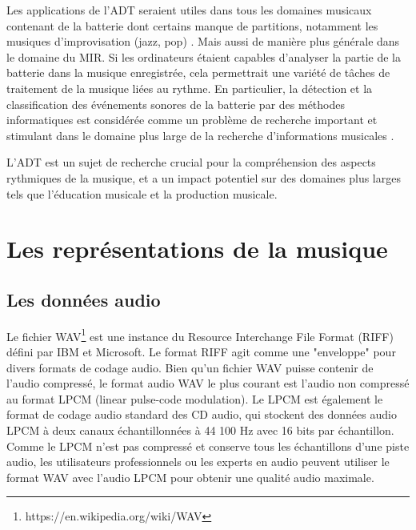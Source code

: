 Les applications de l’ADT seraient utiles dans tous les domaines musicaux 
contenant de la batterie dont certains manque de partitions, 
notamment les musiques d’improvisation (jazz, pop) \cite{future_directions}.
%
Mais aussi de manière plus générale dans le domaine du MIR. 
Si les ordinateurs étaient capables d'analyser la partie de la batterie dans la musique enregistrée, 
cela permettrait 
une variété de tâches de traitement de la musique liées au rythme. En particulier, la détection et la classification des événements sonores de la batterie par des méthodes informatiques est considérée comme un problème de recherche important et stimulant dans le domaine plus large de la recherche d'informations musicales \cite{Review_ADT}.

L'ADT est un sujet de recherche crucial pour la compréhension des aspects rythmiques de la musique, et a un impact potentiel sur des domaines plus larges tels que l'éducation musicale et la production musicale.

\section{Les représentations de la musique}

\subsection*{Les données audio}
Le fichier WAV\footnote{https://en.wikipedia.org/wiki/WAV} est une instance du Resource Interchange File Format (RIFF) défini par IBM et Microsoft. 
Le format RIFF agit comme une "enveloppe" pour divers formats de codage audio.
Bien qu'un fichier WAV puisse contenir de l'audio compressé, 
le format audio WAV le plus courant est l'audio non compressé au format LPCM (linear pulse-code modulation). 
Le LPCM est également le format de codage audio standard des CD audio, qui stockent des données audio LPCM à deux canaux échantillonnées à 44 100 Hz avec 16 bits par échantillon. Comme le LPCM n'est pas compressé et conserve tous les échantillons d'une piste audio, les utilisateurs professionnels ou les experts en audio peuvent utiliser le format WAV avec l'audio LPCM pour obtenir une qualité audio maximale.

